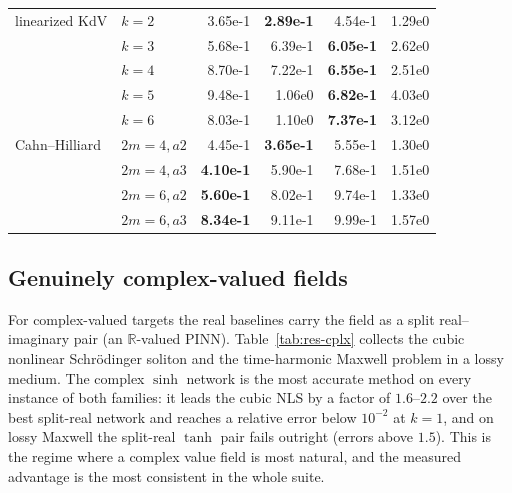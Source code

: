 \begin{table}[htbp]
\begin{tabular}{@{}llrrrr@{}}
\midrule
linearized KdV  & \(k{=}2\)   & 3.65e-1 & \textbf{2.89e-1} & 4.54e-1 & 1.29e0 \\
                & \(k{=}3\)   & 5.68e-1 & 6.39e-1 & \textbf{6.05e-1} & 2.62e0 \\
                & \(k{=}4\)   & 8.70e-1 & 7.22e-1 & \textbf{6.55e-1} & 2.51e0 \\
                & \(k{=}5\)   & 9.48e-1 & 1.06e0  & \textbf{6.82e-1} & 4.03e0 \\
                & \(k{=}6\)   & 8.03e-1 & 1.10e0  & \textbf{7.37e-1} & 3.12e0 \\
\midrule
Cahn--Hilliard  & \(2m{=}4,a2\) & 4.45e-1 & \textbf{3.65e-1} & 5.55e-1 & 1.30e0 \\
                & \(2m{=}4,a3\) & \textbf{4.10e-1} & 5.90e-1 & 7.68e-1 & 1.51e0 \\
                & \(2m{=}6,a2\) & \textbf{5.60e-1} & 8.02e-1 & 9.74e-1 & 1.33e0 \\
                & \(2m{=}6,a3\) & \textbf{8.34e-1} & 9.11e-1 & 9.99e-1 & 1.57e0 \\
\bottomrule
\end{tabular}
\end{table}

\subsection{Genuinely complex-valued fields}\label{ssec:res-cplx}

For complex-valued targets the real baselines carry the field as a split
real--imaginary pair (an \(\mathbb{R}\)-valued PINN). Table~\ref{tab:res-cplx}
collects the cubic nonlinear Schr\"odinger soliton and the time-harmonic Maxwell
problem in a lossy medium. The complex \(\sinh\) network is the most accurate
method on every instance of both families: it leads the cubic NLS by a factor of
\(1.6\)--\(2.2\) over the best split-real network and reaches a relative error
below \(10^{-2}\) at \(k=1\), and on lossy Maxwell the split-real \(\tanh\) pair
fails outright (errors above \(1.5\)). This is the regime where a complex value
field is most natural, and the measured advantage is the most consistent in the
whole suite.

